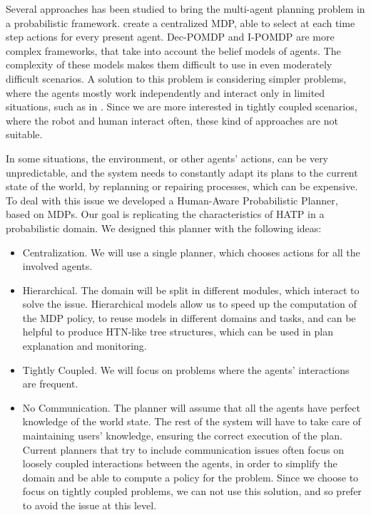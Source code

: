 Several approaches has been studied to bring the multi-agent planning problem in a probabilistic framework. \cite{boutilier1999sequential} create a centralized MDP, able to select at each time step actions for every present agent. Dec-POMDP \cite{bernstein2002complexity} and I-POMDP \cite{gmytrasiewicz2005framework} are more complex frameworks, that take into account the belief models of agents. The complexity of these models makes them difficult to use in even moderately difficult scenarios. A solution to this problem is considering simpler problems, where the agents mostly work independently and interact only in limited situations, such as in \cite{melo2013heuristic}.  Since we are more interested in tightly coupled scenarios, where the robot and human interact often, these kind of approaches are not suitable.


In some situations, the environment, or other agents' actions, can be very unpredictable, and the system needs to constantly adapt its plans to the current state of the world, by replanning or repairing processes, which can be expensive. To deal with this issue we developed a Human-Aware Probabilistic Planner, based on MDPs. Our goal is replicating the characteristics of HATP in a probabilistic domain. We designed this planner with the following ideas:

\begin{itemize}
\item Centralization. We will use a single planner, which chooses actions for all the involved agents.
\item Hierarchical. The domain will be split in different modules, which interact to solve the issue. Hierarchical models allow us to speed up the computation of the MDP policy, to reuse models in different domains and tasks, and can be helpful to produce HTN-like tree structures, which can be used in plan explanation and monitoring.
\item Tightly Coupled. We will focus on problems where the agents' interactions are frequent.
\item No Communication. The planner will  assume that all the agents have perfect knowledge of the world state. The rest of the system will have to take care of maintaining users' knowledge, ensuring the correct execution of the plan. Current planners that try to include communication issues often focus on loosely coupled interactions between the agents, in order to simplify the domain and be able to compute a policy for the problem. Since we choose to focus on tightly coupled problems, we can not use this solution, and so prefer to avoid the issue at this level.
\end{itemize}


